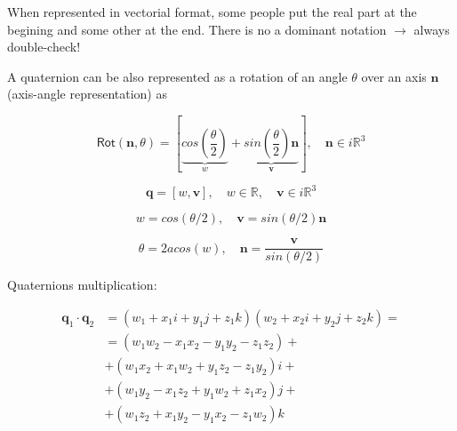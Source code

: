 \documentclass[10pt, aspectratio=169]{beamer}
\theoremstyle{remark}
\theoremstyle{definition}
\begin{document}
\begin{frame}[allowframebreaks]
\begin{enumerate}
\begin{itemize}
\begin{itemize}
            \textcolor{uma_pink}{When represented in vectorial format, some people put the real part at the begining and some other at the end. There is no a dominant notation $\rightarrow$ always double-check!}

            \framebreak
            
            A quaternion can be also represented as a rotation of an angle $\theta$ over an axis $\mathbf{n}$ (axis-angle representation) as

            $$
            \textsf{Rot}(\mathbf{n}, \theta) = \left[\underbrace{cos\left(\frac{\theta}{2}\right)}_{w} + \underbrace{sin\left(\frac{\theta}{2}\right) \mathbf{n}}_{\mathbf{v}}\right], \quad \mathbf{n}\in i\mathbb{R}^3
            $$

            $$
            \mathbf{q} = [w, \mathbf{v}], \quad w\in\mathbb{R}, \quad \mathbf{v}\in i \mathbb{R}^3
            $$

            $$
            w = cos\left(\theta/2\right), \quad \mathbf{v} = sin\left(\theta/2\right)\mathbf{n}
            $$

            \begin{equation}
                \theta = 2 acos\left(w\right), \quad \mathbf{n} = \frac{\mathbf{v}}{sin\left(\theta/2\right)}
                \label{eq:axis-angle-quaternion}
            \end{equation}
            
            \framebreak

            Quaternions multiplication:

            \begin{equation*}
                \begin{split}
                    \mathbf{q}_1 \cdot \mathbf{q}_2 & = (w_1+x_1i+y_1j+z_1k)(w_2+x_2i+y_2j+z_2k) = \\
                                             & = (w_1w_2 - x_1x_2 - y_1y_2 - z_1z_2)+ \\
                                             & + (w_1x_2 + x_1w_2 + y_1z_2 - z_1y_2) i +\\
                                             & + (w_1y_2 - x_1z_2 + y_1w_2 + z_1x_2) j +\\
                                             & + (w_1z_2 + x_1y_2 - y_1x_2 - z_1w_2) k\\
                \end{split}
            \end{equation*}


\end{itemize}
\end{itemize}
\end{enumerate}
\end{frame}
\end{document}
